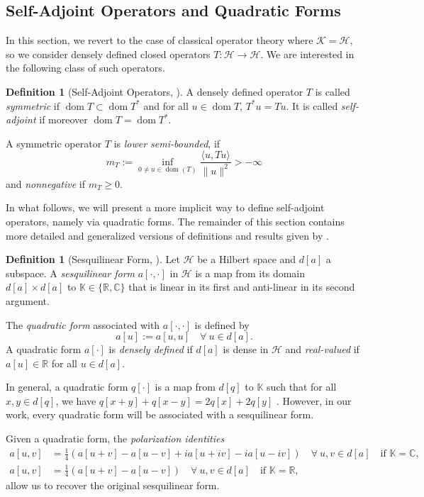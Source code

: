 \documentclass[11pt]{article}
\theoremstyle{definition}
\newtheorem{definition}[theorem]{Definition}
\theoremstyle{remark}
\DeclareMathOperator\dom{dom}
\newcommand{\Hh}{\mathcal{H}}
\newcommand{\Kk}{\mathcal{K}}
\newcommand{\R}{\mathbb{R}}
\newcommand{\IK}{\mathbb{K}}
\newcommand{\IC}{\mathbb{C}}
\begin{document}
\subsection{Self-Adjoint Operators and Quadratic Forms}
In this section, we revert to the case of classical operator theory where $\Kk=\Hh$, so we consider densely defined closed operators $T:\Hh \rightarrow \Hh$. We are interested in the following class of such operators. 

\begin{definition}[Self-Adjoint Operators, \citet{schroedingerop}]
    A densely defined operator $T$ is called \emph{symmetric} if $\dom T \subset \dom T^*$ and for all $u\in \dom T$, $T^*u=Tu$. It is called \emph{self-adjoint} if moreover $\dom T=\dom T^*$.
    
    A symmetric operator $T$ is \emph{lower semi-bounded}, if $$m_T:=\inf_{0\neq u \in \dom(T)}\frac{\langle u, Tu\rangle}{\|u\|^2} > -\infty$$
    and \emph{nonnegative} if $m_T \ge 0$.
\end{definition}

In what follows, we will present a more implicit way to define self-adjoint operators, namely via quadratic forms. The remainder of this section contains more detailed and generalized versions of definitions and results given by \citet[pp.~29-31]{schroedingerop}.


\begin{definition}[Sesquilinear Form, \citet{schroedingerop}]
    Let $\Hh$ be a Hilbert space and $d[a]$ a subspace.
    A \emph{sesquilinear form} $a[\cdot,\cdot]$ in $\mathcal{H}$ is a map from its domain $d[a]\times d[a]$ to $\mathbb{K} \in \{\R,\IC\}$ that is linear in its first and anti-linear in its second argument.
    
    The \emph{quadratic form} associated with $a[\cdot,\cdot]$ is defined by
    $$a[u]:=a[u,u]\quad\forall\ u\in d[a].$$
    A quadratic form $a[\cdot]$ is \emph{densely defined} if $d[a]$ is dense in $\Hh$ and \emph{real-valued} if
    $a[u]\in \R$ for all $u \in d[a].$
\end{definition}

In general, a quadratic form $q[\cdot]$ is a map from $d[q]$ to $\IK$ such that for all $x,y\in d[q]$, we have $q[x+y]+q[x-y]=2q[x]+2q[y]$ \citep{kurepa}.  However, in our work, every quadratic form will be associated with a sesquilinear form.

Given a quadratic form, the \emph{polarization identities}
\begin{subequations}
    \begin{align}
    a[u,v]&=\frac{1}{4}(a[u+v]-a[u-v]+ia[u+iv]-ia[u-iv])\quad  \forall\ u,v\in d[a] \quad \text{if } \IK=\IC, \label{eq:polc}\\
    a[u,v]&=\frac{1}{4}(a[u+v]-a[u-v])\quad \forall\ u,v\in d[a] \quad \text{if } \IK=\R, \label{eq:polr}
\end{align}
\end{subequations}
allow us to recover the original sesquilinear form.
\end{document}
